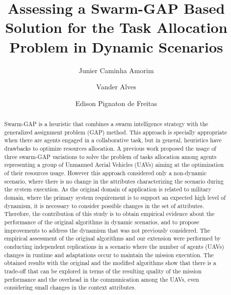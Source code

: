 \documentclass[review]{elsarticle}
\newcommand{\uavs}{UAVs}
\begin{document}
\begin{frontmatter}
	
\title{Assessing a Swarm-GAP Based Solution for the Task Allocation Problem in Dynamic Scenarios}

\author[unbaddress]{Junier Caminha Amorim}

\author[unbaddress]{Vander Alves}


\author[ufrgsaddress]{Edison Pignaton de Freitas}

\address[unbaddress]{Computation Science Department University of Brasilia, Brazil}
\address[ufrgsaddress]{Institute of Informatics Federal University of Rio Grande do Sul, Brazil}

\begin{abstract}
Swarm-GAP is a heuristic that combines a swarm intelligence strategy with the generalized assignment problem (GAP) method. This approach is specially appropriate when there are agents engaged in a collaborative task, but in general, heuristics have drawbacks to optimize resources allocation. A previous work proposed the usage of three swarm-GAP variations to solve the problem of tasks allocation among agents representing a group of Unmanned Aerial Vehicles (\uavs) aiming at the optimization of their resources usage. However this approach considered only a non-dynamic scenario, where there is no change in the attributes characterizing the scenario during the system execution. As the original domain of application is related to military domain, where the primary system requirement is to support an expected high level of dynamism, it is necessary to consider possible changes in the set of attributes. Therefore, the contribution of this study is to obtain empirical evidence about the performance of the original algorithms in dynamic scenarios, and to propose improvements to address the dynamism that was not previously considered. The empirical assessment of the original algorithms and our extension were performed by conducting independent replications in a scenario where the number of agents (\uavs) changes in runtime and adaptations occur to maintain the mission execution. The obtained results with the original and the modified algorithms show that there is a trade-off that can be explored in terms of the resulting quality of the mission performance and the overhead in the communication among the \uavs, even considering small changes in the context attributes. 
\end{abstract}



\end{frontmatter}
\end{document}
